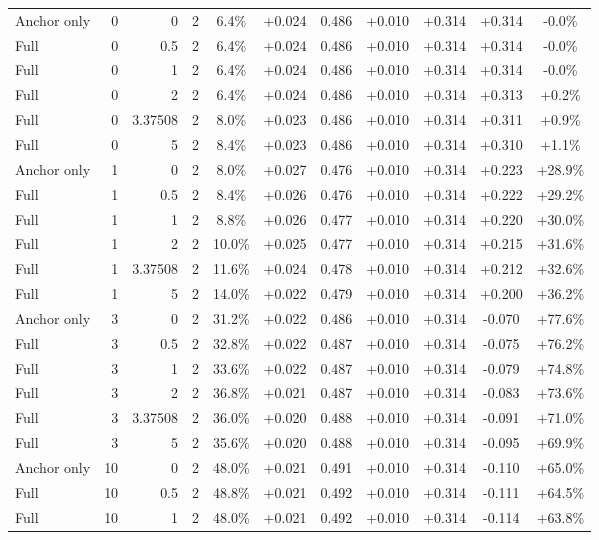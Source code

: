 \begin{table}[htbp]
\begin{tabular}{lrrrccccccc}
Anchor only & 0 & 0 & 2 & 6.4\% & +0.024 & 0.486 & +0.010 & +0.314 & +0.314 & -0.0\% \\
Full & 0 & 0.5 & 2 & 6.4\% & +0.024 & 0.486 & +0.010 & +0.314 & +0.314 & -0.0\% \\
Full & 0 & 1 & 2 & 6.4\% & +0.024 & 0.486 & +0.010 & +0.314 & +0.314 & -0.0\% \\
Full & 0 & 2 & 2 & 6.4\% & +0.024 & 0.486 & +0.010 & +0.314 & +0.313 & +0.2\% \\
Full & 0 & 3.37508 & 2 & 8.0\% & +0.023 & 0.486 & +0.010 & +0.314 & +0.311 & +0.9\% \\
Full & 0 & 5 & 2 & 8.4\% & +0.023 & 0.486 & +0.010 & +0.314 & +0.310 & +1.1\% \\
Anchor only & 1 & 0 & 2 & 8.0\% & +0.027 & 0.476 & +0.010 & +0.314 & +0.223 & +28.9\% \\
Full & 1 & 0.5 & 2 & 8.4\% & +0.026 & 0.476 & +0.010 & +0.314 & +0.222 & +29.2\% \\
Full & 1 & 1 & 2 & 8.8\% & +0.026 & 0.477 & +0.010 & +0.314 & +0.220 & +30.0\% \\
Full & 1 & 2 & 2 & 10.0\% & +0.025 & 0.477 & +0.010 & +0.314 & +0.215 & +31.6\% \\
Full & 1 & 3.37508 & 2 & 11.6\% & +0.024 & 0.478 & +0.010 & +0.314 & +0.212 & +32.6\% \\
Full & 1 & 5 & 2 & 14.0\% & +0.022 & 0.479 & +0.010 & +0.314 & +0.200 & +36.2\% \\
Anchor only & 3 & 0 & 2 & 31.2\% & +0.022 & 0.486 & +0.010 & +0.314 & -0.070 & +77.6\% \\
Full & 3 & 0.5 & 2 & 32.8\% & +0.022 & 0.487 & +0.010 & +0.314 & -0.075 & +76.2\% \\
Full & 3 & 1 & 2 & 33.6\% & +0.022 & 0.487 & +0.010 & +0.314 & -0.079 & +74.8\% \\
Full & 3 & 2 & 2 & 36.8\% & +0.021 & 0.487 & +0.010 & +0.314 & -0.083 & +73.6\% \\
Full & 3 & 3.37508 & 2 & 36.0\% & +0.020 & 0.488 & +0.010 & +0.314 & -0.091 & +71.0\% \\
Full & 3 & 5 & 2 & 35.6\% & +0.020 & 0.488 & +0.010 & +0.314 & -0.095 & +69.9\% \\
Anchor only & 10 & 0 & 2 & 48.0\% & +0.021 & 0.491 & +0.010 & +0.314 & -0.110 & +65.0\% \\
Full & 10 & 0.5 & 2 & 48.8\% & +0.021 & 0.492 & +0.010 & +0.314 & -0.111 & +64.5\% \\
Full & 10 & 1 & 2 & 48.0\% & +0.021 & 0.492 & +0.010 & +0.314 & -0.114 & +63.8\% \\

\end{tabular}
\end{table}
